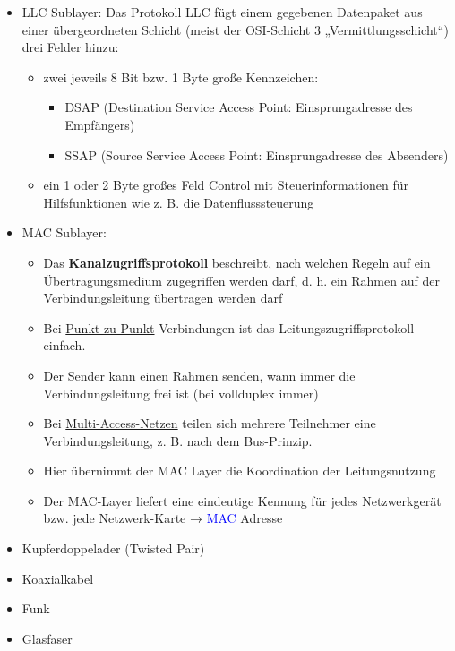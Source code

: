 
\begin{itemize}
    \item LLC Sublayer: Das Protokoll LLC fügt einem gegebenen Datenpaket aus einer übergeordneten Schicht (meist der OSI-Schicht 3 „Vermittlungsschicht“) drei Felder hinzu:
    \begin{itemize}
        \item zwei jeweils 8 Bit bzw. 1 Byte große Kennzeichen:
        \begin{itemize}
            \item DSAP (Destination Service Access Point: Einsprungadresse des Empfängers)
            \item SSAP (Source Service Access Point: Einsprungadresse des Absenders)
        \end{itemize}
        \item ein 1 oder 2 Byte großes Feld Control mit Steuerinformationen für Hilfsfunktionen wie z. B. die Datenflusssteuerung
    \end{itemize}
    \item MAC Sublayer:
    \begin{itemize}
        \item Das \textbf{Kanalzugriffsprotokoll} beschreibt, nach welchen Regeln auf ein Übertragungsmedium zugegriffen werden darf,
        d. h. ein Rahmen auf der Verbindungsleitung übertragen werden darf
        \item Bei \underline{Punkt-zu-Punkt}-Verbindungen ist das Leitungszugriffsprotokoll einfach.
        \item Der Sender kann einen Rahmen senden, wann immer die Verbindungsleitung frei ist (bei vollduplex immer)
        \item Bei \underline{Multi-Access-Netzen} teilen sich mehrere Teilnehmer eine Verbindungsleitung, z. B. nach dem Bus-Prinzip.
        \item Hier übernimmt der MAC Layer die Koordination der Leitungsnutzung
        \item Der MAC-Layer liefert eine eindeutige Kennung für jedes Netzwerkgerät bzw. jede Netzwerk-Karte → \textcolor{blue}{MAC} Adresse
    \end{itemize}
\end{itemize}

\begin{itemize}
    \item Kupferdoppelader (Twisted Pair)
    \item Koaxialkabel
    \item Funk
    \item Glasfaser
\end{itemize}

